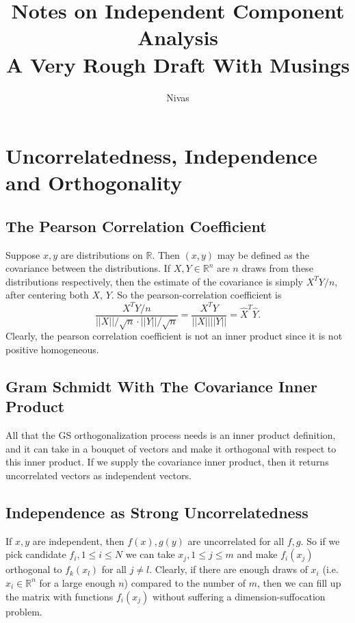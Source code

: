 \documentclass[reqno]{amsart}
\title{Notes on Independent Component Analysis \\ \tiny{A Very Rough Draft With Musings}}
\author{Nivas}
\newcommand{\rl}{\mathbb{R}}
\newcommand{\norm}[1]{\left| \left| #1 \right| \right|}
\begin{document}
\maketitle
\section{Uncorrelatedness, Independence and Orthogonality}
\subsection{The Pearson Correlation Coefficient}
Suppose $x, y$ are distributions on $\rl$. Then $(x, y)$ may be defined as the covariance between the distributions. If $X, Y \in \rl^n$ are $n$ draws from these distributions respectively, then the estimate of the covariance is simply $X^T Y / n$, after centering both $X$, $Y$. So the pearson-correlation coefficient is
\[  \frac{X^T Y / n}{\norm{X}/ \sqrt{n} \cdot \norm{Y}/\sqrt{n}} = \frac{X^T Y}{\norm{X} \norm{Y}} = \hat{X}^T \hat{Y}. \]
Clearly, the pearson correlation coefficient is not an inner product since it is not positive homogeneous. 

\subsection{Gram Schmidt With The Covariance Inner Product}
All that the GS orthogonalization process needs is an inner product definition, and it can take in a bouquet of vectors and make it orthogonal with respect to this inner product. If we supply the covariance inner product, then it returns uncorrelated vectors as independent vectors. 

\subsection{Independence as Strong Uncorrelatedness}
If $x, y$ are independent, then $f(x), g(y)$ are uncorrelated for all $f, g$. So if we pick candidate $f_i, 1 \leq i \leq N$ we can take $x_j, 1 \leq j \leq m$ and make $f_i(x_j)$ orthogonal to $f_k(x_l)$ for all $j \neq l$. Clearly, if there are enough draws of $x_i$ (i.e. $x_i \in \rl^n$ for a large enough $n$) compared to the number of $m$, then we can fill up the matrix with functions $f_i(x_j)$ without suffering a dimension-suffocation problem.
\end{document}

